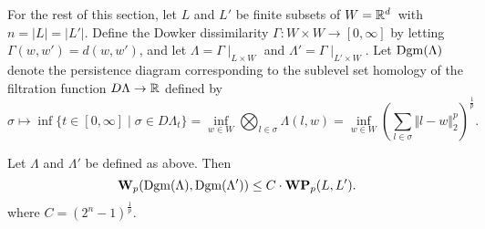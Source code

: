 	For the rest of this section, let $L$ and $L'$ be finite subsets of $W=\mathbb{R}^d$ with $n=|L|=|L'|$. Define the Dowker dissimilarity $\Gamma\colon W\times W\to [0,\infty]$ by letting $\Gamma(w,w')=d(w,w')$, and let $\Lambda=\Gamma\mid_{L\times W}$ and $\Lambda'=\Gamma\mid_{L'\times W}$. Let $\operatorname{Dgm}(\Lambda)$ denote the persistence diagram corresponding to the sublevel set homology of the filtration function $D\Lambda\to\mathbb{R}$ defined by 
	\begin{equation}\label{eq:filtration_function}
		\sigma\mapsto \inf\{t\in[0,\infty]\mid\sigma\in D\Lambda_t\} = \inf_{w\in W}\bigotimes_{l\in\sigma}\Lambda(l,w)=\inf_{w\in W}\left(\sum_{l\in\sigma}\Vert l-w\Vert_2^p\right)^{\frac{1}{p}}.
	\end{equation}

	\begin{cor}
		Let $\Lambda$ and $\Lambda'$ be defined as above. Then
		$$
			\textbf{W}_p(\operatorname{Dgm}(\Lambda), \operatorname{Dgm}(\Lambda'))\leq C\cdot\textbf{WP}_p(L,L').
		$$
		where $C=(2^n-1)^{\frac{1}{p}}$.
	\end{cor}

